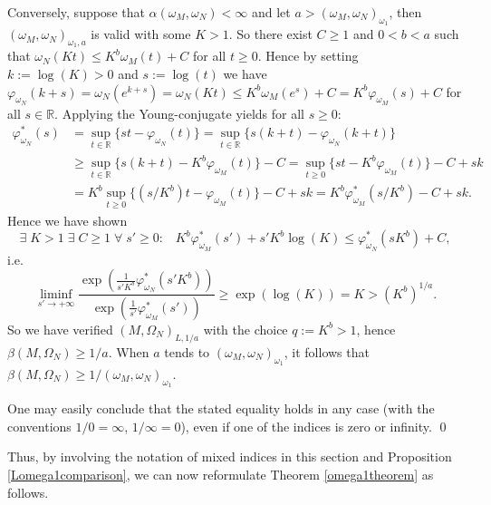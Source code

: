 \documentclass[10pt]{amsart}%
\numberwithin{equation}{section}
\theoremstyle{plain}
\newcommand{\RR}{\mathbb{R}}
\begin{document}
Conversely, suppose that $\alpha(\omega_{M},\omega_{N})<\infty$ and let $a>(\omega_{M},\omega_{N})_{\omega_1}$, then $(\omega_{M},\omega_{N})_{\omega_1,a}$ is valid with some $K>1$. So there exist $C\ge 1$ and $0<b<a$ such that $\omega_{N}(Kt)\le K^{b}\omega_{M}(t)+C$ for all $t\ge 0$. Hence by setting $k:=\log(K)>0$ and $s:=\log(t)$ we have $\varphi_{\omega_N}(k+s)=\omega_{N}(e^{k+s})=\omega_N(Kt)\le K^{b}\omega_{M}(e^s)+C=K^{b}\varphi_{\omega_{M}}(s)+C$ for all $s\in\RR$. Applying the Young-conjugate yields for all $s\ge 0$:
\begin{align*}
\varphi^{*}_{\omega_{N}}(s)&=\sup_{t\in\RR}\{st-\varphi_{\omega_{N}}(t)\}=\sup_{t\in\RR}\{s(k+t)-\varphi_{\omega_{N}}(k+t)\}
\\&
\ge\sup_{t\in\RR}\{s(k+t)-K^{b}\varphi_{\omega_{M}}(t)\}-C=\sup_{t\ge 0}\{st-K^{b}\varphi_{\omega_{M}}(t)\}-C+sk
\\&
=K^{b}\sup_{t\ge 0}\{(s/K^{b})t-\varphi_{\omega_{M}}(t)\}-C+sk= K^{b}\varphi^{*}_{\omega_{M}}(s/K^{b})-C+sk.
\end{align*}
Hence we have shown
$$\exists\;K>1\;\exists\;C\ge 1\;\forall\;s'\ge 0:\;\;\;K^{b}\varphi^{*}_{\omega_{M}}(s')+s'K^{b}\log(K)\le \varphi^{*}_{\omega_{N}}(sK^{b})+C,$$
i.e. $$\liminf_{s'\rightarrow+\infty} \frac{\exp\left(\frac{1}{s'K^{b}}\varphi^{*}_{\omega_{N}}(s'K^{b})\right)}{\exp\left(\frac{1}{s'}\varphi^{*}_{\omega_{M}}(s')\right)}\ge\exp(\log(K))=K>(K^b)^{1/a}.
$$
So we have verified $(M,\Omega_N)_{L,1/a}$ with the choice $q:=K^{b}>1$, hence $\beta(M,\Omega_N)\ge 1/a$. When $a$ tends to $(\omega_{M},\omega_{N})_{\omega_1}$, it follows that $\beta(M,\Omega_N)\ge 1/(\omega_{M},\omega_{N})_{\omega_1}$.

One may easily conclude that the stated equality holds in any case (with the conventions $1/0=\infty$, $1/\infty=0$), even if one of the indices is zero or infinity.
\qed\enddemo

Thus, by involving the notation of mixed indices in this section and Proposition \ref{Lomega1comparison}, we can now reformulate Theorem \ref{omega1theorem} as follows.
\end{document}
